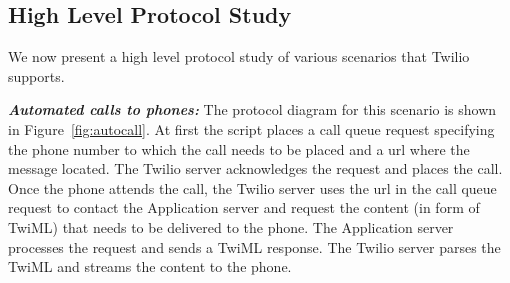 \subsection{High Level Protocol Study}
\label{subsec-protostudy}
We now present a high level protocol study of various scenarios that Twilio supports. 

\emph{\textbf{Automated calls to phones:} }
The protocol diagram for this scenario is shown in  Figure~\ref{fig:autocall}. At first the script places a call queue request specifying the phone number to which the call needs to be placed and a url where the message located. The Twilio server acknowledges the request and places the call. Once the phone attends the call, the Twilio server uses the url in the call queue request to contact the Application server and request the content (in form of TwiML) that needs to be delivered to the phone. The Application server processes the request and sends a TwiML response. The Twilio server parses the TwiML and streams the content to the phone.  


